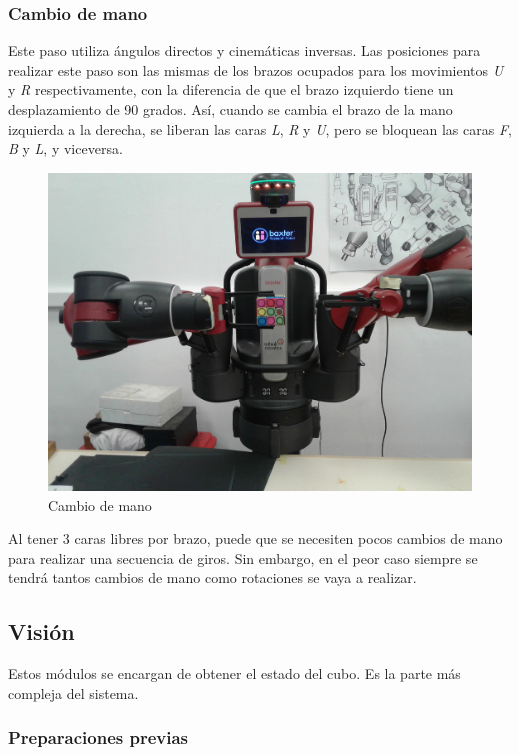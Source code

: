 \subsubsection{Cambio de mano}
Este paso utiliza ángulos directos y cinemáticas inversas. Las posiciones para realizar este paso son las mismas de los brazos ocupados para los movimientos \textit{U} y \textit{R} respectivamente, con la diferencia de que el brazo izquierdo tiene un desplazamiento de 90 grados. Así, cuando se cambia el brazo de la mano izquierda a la derecha, se liberan las caras \textit{L}, \textit{R} y \textit{U}, pero se bloquean las caras \textit{F}, \textit{B} y \textit{L}, y viceversa.

\begin{figure}[h!]
	\centering
	\includegraphics[scale=0.1]{figures/switch}
	\caption{Cambio de mano}
	\label{switch}
\end{figure}

Al tener 3 caras libres por brazo, puede que se necesiten pocos cambios de mano para realizar una secuencia de giros. Sin embargo, en el peor caso siempre se tendrá tantos cambios de mano como rotaciones se vaya a realizar.

\subsection{Visión}
Estos módulos se encargan de obtener el estado del cubo. Es la parte más compleja del sistema.
\subsubsection{Preparaciones previas}

